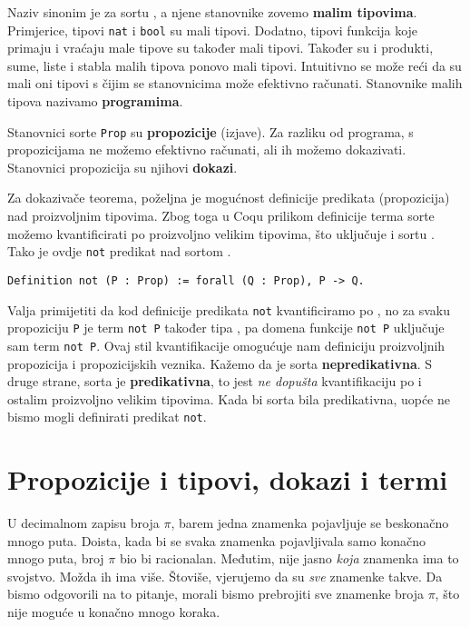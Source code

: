 Naziv \coqset{} sinonim je za sortu , a njene stanovnike zovemo \textbf{malim tipovima}.
Primjerice, tipovi \texttt{nat} i \texttt{bool} su mali tipovi.
Dodatno, tipovi funkcija koje primaju i vraćaju male tipove su također mali tipovi.
Također su i produkti, sume, liste i stabla malih tipova ponovo mali tipovi.
Intuitivno se može reći da su mali oni tipovi s čijim se stanovnicima može efektivno računati.
Stanovnike malih tipova nazivamo \textbf{programima}.

Stanovnici sorte \texttt{Prop} su \textbf{propozicije} (izjave).
Za razliku od programa, s propozicijama ne možemo efektivno računati, ali ih možemo dokazivati.
Stanovnici propozicija su njihovi \textbf{dokazi}.

Za dokazivače teorema, poželjna je mogućnost definicije predikata (propozicija) nad proizvoljnim tipovima.
Zbog toga u Coqu prilikom definicije terma sorte \coqprop možemo
kvantificirati po proizvoljno velikim tipovima, što uključuje i sortu \coqprop.
Tako je ovdje \texttt{not} predikat nad sortom \coqprop.
\begin{verbatim}
Definition not (P : Prop) := forall (Q : Prop), P -> Q.
\end{verbatim}
\noindent Valja primijetiti da kod definicije predikata \texttt{not} kvantificiramo po \coqprop{},
no za svaku propoziciju \texttt{P} je term \texttt{not P} također tipa \coqprop{}, pa
domena funkcije \texttt{not P} uključuje sam term \texttt{not P}.
Ovaj stil kvantifikacije omogućuje nam definiciju proizvoljnih propozicija i propozicijskih veznika.
Kažemo da je sorta \coqprop{} \textbf{nepredikativna}.
S druge strane, sorta \coqset{} je \textbf{predikativna}, to jest \textit{ne dopušta} kvantifikaciju po \coqset{} i ostalim proizvoljno velikim tipovima.
Kada bi sorta \coqprop{} bila predikativna, uopće ne bismo mogli definirati predikat \texttt{not}.

\section{Propozicije i tipovi, dokazi i termi}\label{sec:propozicije-i-tipovi}
U decimalnom zapisu broja \(\pi\), barem jedna znamenka pojavljuje se beskonačno mnogo puta.
Doista, kada bi se svaka znamenka pojavljivala samo konačno mnogo puta, broj \(\pi\) bio bi racionalan.
Međutim, nije jasno \textit{koja} znamenka ima to svojstvo.
Možda ih ima više. Štoviše, vjerujemo da su \textit{sve} znamenke takve.
Da bismo odgovorili na to pitanje, morali bismo prebrojiti sve znamenke broja \(\pi\),
što nije moguće u konačno mnogo koraka.

